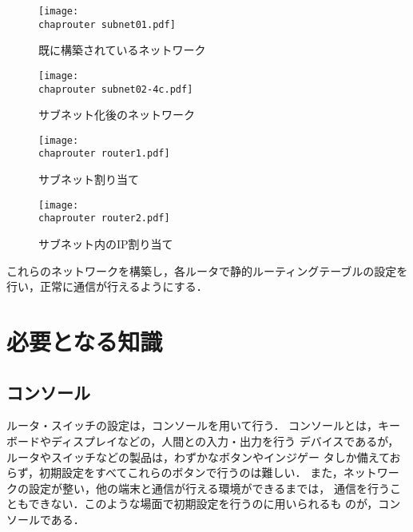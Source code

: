 \begin{figure}[tb]
\begin{center}
 \texttt{[image: \\chaprouter subnet01.pdf]}
 \caption{既に構築されているネットワーク}
\end{center} 
\end{figure}

\begin{figure}[tb]
\begin{center}
 \texttt{[image: \\chaprouter subnet02-4c.pdf]}
 \caption{サブネット化後のネットワーク}
\end{center} 
\end{figure}

\begin{figure}[tb]
\begin{center}
 \texttt{[image: \\chaprouter router1.pdf]}
 \caption{サブネット割り当て}
 \label{fig:16:subnet}
\end{center} 
\end{figure}

\begin{figure}[tb]
\begin{center}
 \texttt{[image: \\chaprouter router2.pdf]}
 \caption{サブネット内のIP割り当て}
 \label{fig:16:ipadress}
\end{center} 
\end{figure}

これらのネットワークを構築し，各ルータで静的ルーティングテーブルの設定を
行い，正常に通信が行えるようにする．

\section{必要となる知識}


\subsection{コンソール}
ルータ・スイッチの設定は，コンソールを用いて行う．
コンソールとは，キーボードやディスプレイなどの，人間との入力・出力を行う
デバイスであるが，ルータやスイッチなどの製品は，わずかなボタンやインジゲー
タしか備えておらず，初期設定をすべてこれらのボタンで行うのは難しい．
また，ネットワークの設定が整い，他の端末と通信が行える環境ができるまでは，
通信を行うこともできない．このような場面で初期設定を行うのに用いられるも
のが，コンソールである．

